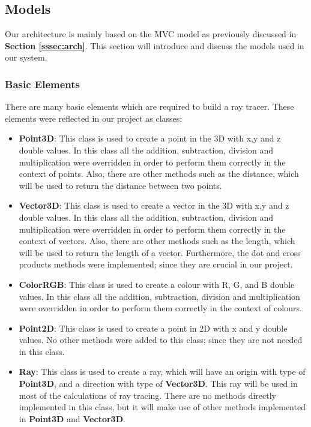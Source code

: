 \documentclass[a4paper]{report}
\begin{document}
	\subsection{Models}
	Our architecture is mainly based on the MVC model as previously discussed in \textbf{Section \ref{sssec:arch}}. This section will introduce and discuss the models used in our system.
	\subsubsection{Basic Elements}
	There are many basic elements which are required to build a ray tracer. These elements were reflected in our project as classes: 
	\begin{itemize}
		\item \textbf{Point3D}: This class is used to create a point in the 3D with x,y and z double values. In this class all the addition, subtraction, division and multiplication were overridden in order to perform them correctly in the context of points. Also, there are other methods such as the distance, which will be used to return the distance between two points.
		\item \textbf{Vector3D}: This class is used to create a vector in the 3D with x,y and z double values. In this class all the addition, subtraction, division and multiplication were overridden in order to perform them correctly in the context of vectors. Also, there are other methods such as the length, which will be used to return the length of a vector. Furthermore, the dot and cross products methods were implemented; since they are crucial in our project.
		\item \textbf{ColorRGB}: This class is used to create a colour with R, G, and B double values. In this class all the addition, subtraction, division and multiplication were overridden in order to perform them correctly in the context of colours.
		\item \textbf{Point2D}: This class is used to create a point in 2D with x and y double values. No other methods were added to this class; since they are not needed in this class.
		\item \textbf{Ray}: This class is used to create a ray, which will have an origin with type of \textbf{Point3D}, and a direction with type of \textbf{Vector3D}. This ray will be used in most of the calculations of ray tracing. There are no methods directly implemented in this class, but it will make use of other methods implemented in \textbf{Point3D} and \textbf{Vector3D}.
	\end{itemize}
\end{document}
